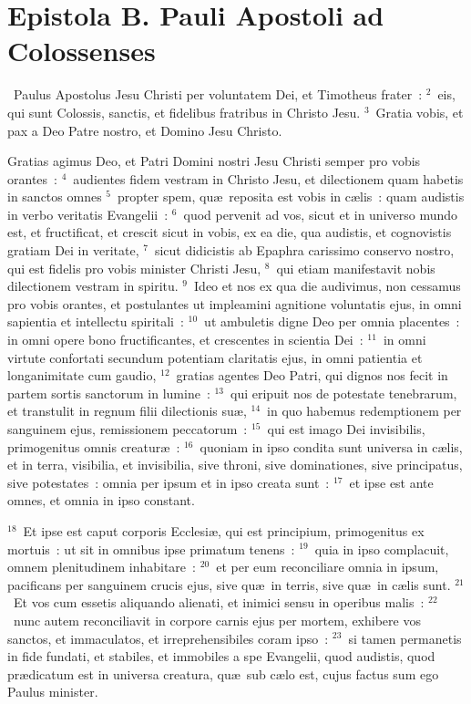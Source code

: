 \clearpage
{\centering \section*{Epistola B. Pauli Apostoli ad Colossenses}}\thispagestyle{empty}

~Paulus Apostolus Jesu Christi per voluntatem Dei, et Timotheus frater~:
${}^{2}$~eis, qui sunt Colossis, sanctis, et fidelibus fratribus in Christo Jesu.
${}^{3}$~Gratia vobis, et pax a Deo Patre nostro, et Domino Jesu Christo.

 Gratias agimus Deo, et Patri Domini nostri Jesu Christi semper pro vobis orantes~:
${}^{4}$~audientes fidem vestram in Christo Jesu, et dilectionem quam habetis in sanctos omnes
${}^{5}$~propter spem, qu\ae\ reposita est vobis in c\ae lis~: quam audistis in verbo veritatis Evangelii~:
${}^{6}$~quod pervenit ad vos, sicut et in universo mundo est, et fructificat, et crescit sicut in vobis, ex ea die, qua audistis, et cognovistis gratiam Dei in veritate,
${}^{7}$~sicut didicistis ab Epaphra carissimo conservo nostro, qui est fidelis pro vobis minister Christi Jesu,
${}^{8}$~qui etiam manifestavit nobis dilectionem vestram in spiritu.
${}^{9}$~Ideo et nos ex qua die audivimus, non cessamus pro vobis orantes, et postulantes ut impleamini agnitione voluntatis ejus, in omni sapientia et intellectu spiritali~:
${}^{10}$~ut ambuletis digne Deo per omnia placentes~: in omni opere bono fructificantes, et crescentes in scientia Dei~:
${}^{11}$~in omni virtute confortati secundum potentiam claritatis ejus, in omni patientia et longanimitate cum gaudio,
${}^{12}$~gratias agentes Deo Patri, qui dignos nos fecit in partem sortis sanctorum in lumine~:
${}^{13}$~qui eripuit nos de potestate tenebrarum, et transtulit in regnum filii dilectionis su\ae ,
${}^{14}$~in quo habemus redemptionem per sanguinem ejus, remissionem peccatorum~:
${}^{15}$~qui est imago Dei invisibilis, primogenitus omnis creatur\ae~:
${}^{16}$~quoniam in ipso condita sunt universa in c\ae lis, et in terra, visibilia, et invisibilia, sive throni, sive dominationes, sive principatus, sive potestates~: omnia per ipsum et in ipso creata sunt~:
${}^{17}$~et ipse est ante omnes, et omnia in ipso constant.


${}^{18}$~Et ipse est caput corporis Ecclesi\ae , qui est principium, primogenitus ex mortuis~: ut sit in omnibus ipse primatum tenens~:
${}^{19}$~quia in ipso complacuit, omnem plenitudinem inhabitare~:
${}^{20}$~et per eum reconciliare omnia in ipsum, pacificans per sanguinem crucis ejus, sive qu\ae\ in terris, sive qu\ae\ in c\ae lis sunt.
${}^{21}$~Et vos cum essetis aliquando alienati, et inimici sensu in operibus malis~:
${}^{22}$~nunc autem reconciliavit in corpore carnis ejus per mortem, exhibere vos sanctos, et immaculatos, et irreprehensibiles coram ipso~:
${}^{23}$~si tamen permanetis in fide fundati, et stabiles, et immobiles a spe Evangelii, quod audistis, quod pr\ae dicatum est in universa creatura, qu\ae\ sub c\ae lo est, cujus factus sum ego Paulus minister.


